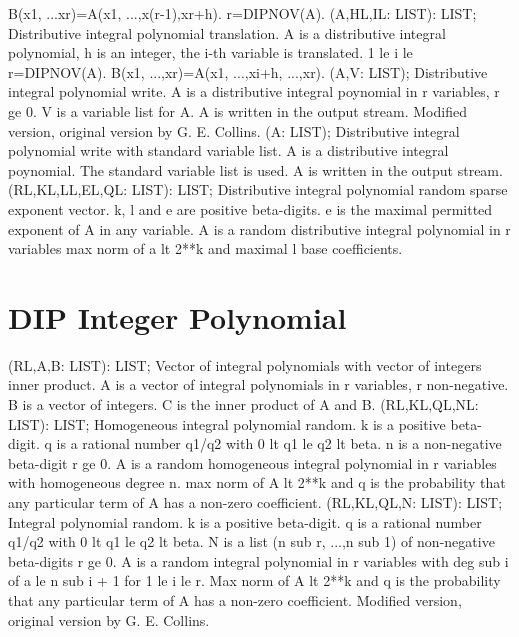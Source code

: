 B(x1, ...xr)=A(x1, ...,x(r-1),xr+h). r=DIPNOV(A).  \ecom 
{} (A,HL,IL: LIST): LIST; \eproc
\bcom Distributive integral polynomial translation. A is a
distributive integral polynomial, h is an integer,
the i-th variable is translated. 1 le i le r=DIPNOV(A).
B(x1, ...,xr)=A(x1, ...,xi+h, ...,xr). \ecom 
{} (A,V: LIST); \eproc
\bcom Distributive integral polynomial write. A is a distributive
integral poynomial in r variables, r ge 0. V is a variable list
for A. A is written in the output stream. Modified version,
original version by G. E. Collins.  \ecom 
{} (A: LIST); \eproc
\bcom Distributive integral polynomial write with standard variable list.
A is a distributive integral poynomial. The standard
variable list is used. A is written in the output stream. \ecom 
{} (RL,KL,LL,EL,QL: LIST): LIST; \eproc
\bcom Distributive integral polynomial random sparse exponent vector.
k, l and e are positive beta-digits. e is the
maximal permitted exponent of A in any variable. A is a
random distributive integral polynomial in r variables
max norm of a lt 2**k and maximal l base coefficients.  \ecom 
\section{ DIP Integer Polynomial  } 
 (RL,A,B: LIST): LIST; \eproc
\bcom Vector of integral polynomials with vector of integers inner product.
A is a vector of integral polynomials in r variables, r non-negative.
B is a vector of integers. C is the inner product of A and B. \ecom 
{} (RL,KL,QL,NL: LIST): LIST; \eproc
\bcom Homogeneous integral polynomial random. k is a positive
beta-digit. q is a rational number q1/q2 with
0 lt q1 le q2 lt beta. n is a non-negative beta-digit
r ge 0.  A is a random homogeneous integral polynomial
in r variables with homogeneous degree n. max norm of
A lt 2**k and q is the probability that any
particular term of A has a non-zero coefficient. \ecom 
{} (RL,KL,QL,N: LIST): LIST; \eproc
\bcom Integral polynomial random. k is a positive beta-digit.
q is a rational number q1/q2 with 0 lt q1 le q2 lt beta.
N is a list (n sub r, ...,n sub 1) of non-negative beta-digits
r ge 0.  A is a random integral polynomial in r variables
with deg sub i of a le n sub i + 1 for 1 le i le r.
Max norm of A lt 2**k and q is the probability that any
particular term of A has a non-zero coefficient. Modified
version, original version by G. E. Collins.  \ecom 
